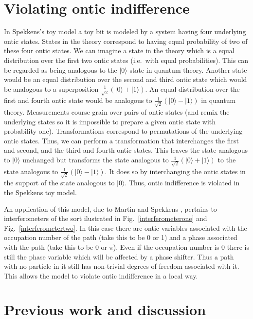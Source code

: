 \documentclass[12pt]{article}
\begin{document}
\section{Violating ontic indifference}



In Spekkens's toy model a toy bit is modeled by a system having four underlying ontic states.  States in the theory correspond to having equal probability of two of these four ontic states.  We can imagine a state in the theory which is a equal distribution over the first two ontic states (i.e.\ with equal probabilities).  This can be regarded as being analogous to the $|0\rangle$ state in quantum theory.  Another state would be an equal distribution over the second and third ontic state which would be analogous to a superposition $\frac{1}{\sqrt{2}}(|0\rangle + |1\rangle)$.  An equal distribution over the first and fourth ontic state would be analogous to $\frac{1}{\sqrt{2}}(|0\rangle - |1\rangle)$ in quantum theory.  Measurements course grain over pairs of ontic states (and remix the underlying states so it is impossible to prepare a given ontic state with probability one).  Transformations correspond to permutations of the underlying ontic states.  Thus, we can perform a transformation that interchanges the first and second, and the third and fourth ontic states.  This leaves the state analogous to $|0\rangle$ unchanged but transforms the state analogous to $\frac{1}{\sqrt{2}}(|0\rangle + |1\rangle)$ to the state analogous to $\frac{1}{\sqrt{2}}(|0\rangle - |1\rangle)$.  It does so by interchanging the ontic states in the support of the state analogous to $|0\rangle$.  Thus, ontic indifference is violated in the Spekkens toy model.

An application of this model, due to Martin and Spekkens \cite{spekkens2012why}, pertains to interferometers of the sort ilustrated in Fig.\ \ref{interferometerone} and Fig.\ \ref{interferometertwo}.  In this case there are ontic variables associated with the occupation number of the path (take this to be 0 or 1) and a phase associated with the path (take this to be 0 or $\pi$).   Even if the occupation number is 0 there is still the phase variable which will be affected by a phase shifter.  Thus a path with no particle in it still has non-trivial degrees of freedom associated with it.  This allows the model to violate ontic indifference in a local way.



\section{Previous work and discussion}
\end{document}
